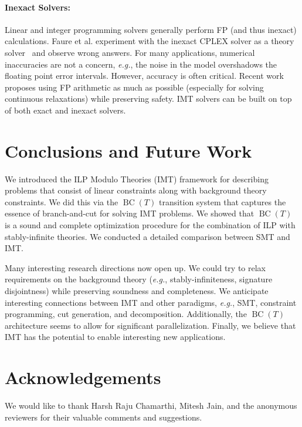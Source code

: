 \documentclass{llncs}
\newcommand{\comment}[1]{}
\newcommand{\eg}[0]{\emph{e.g.}, }
\newcommand{\bct}[0]{\ensuremath{\operatorname{BC}(T)}}
\begin{document}
\paragraph{Inexact Solvers:} Linear and integer programming solvers
generally perform FP (and thus inexact) calculations. Faure et
al. experiment with the inexact CPLEX solver as a theory
solver~\cite{inexact}\comment{They observe that it does not handle
  well the small, incremental queries that an SMT solver performs,}
and observe wrong answers. For many applications, numerical
inaccuracies are not a concern, \eg the noise in the model overshadows
the floating point error intervals. \comment{or an answer close enough
  to the theoretical optimal suffices.} However, accuracy is often
critical. Recent work~\cite{safeboundsmip,exactrational} proposes
using FP arithmetic as much as possible (especially for solving
continuous relaxations) while preserving safety. \comment{that cutting
  planes, infeasibility certificates, and bounds obtained from
  relaxations are safe.} IMT solvers can be built on top of both exact
and inexact solvers.

\section{Conclusions and Future Work}
\label{sec:conclusions}

We introduced the ILP Modulo Theories (IMT) framework for describing
problems that consist of linear constraints along with background
theory constraints.  We did this via the \bct{} transition system that
captures the essence of branch-and-cut for solving IMT problems. We
showed that \bct{} is a sound and complete optimization procedure for
the combination of ILP with stably-infinite theories. We conducted a
detailed comparison between SMT and IMT.

Many interesting research directions now open up. We could try to
relax requirements on the background theory (\eg stably-infiniteness,
signature disjointness) while preserving soundness and
completeness. We anticipate interesting connections between IMT and
other paradigms, \eg SMT, constraint programming, cut generation, and
decomposition. Additionally, the \bct{} architecture seems to allow
for significant parallelization. Finally, we believe that IMT has the
potential to enable interesting new applications.

\section*{Acknowledgements}

We would like to thank Harsh Raju Chamarthi, Mitesh Jain, and the
anonymous reviewers for their valuable comments and suggestions.



\end{document}
